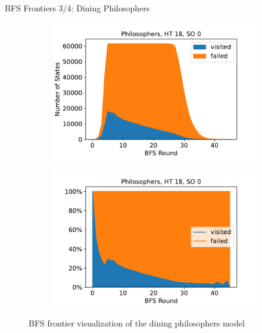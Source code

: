 \documentclass[aspectratio=169]{beamer}
\begin{document}
{\begin{frame}{BFS Frontiers 3/4: Dining Philosophers}
    \begin{figure}
        \begin{subfigure}[b]{.49\textwidth}
            \centering
            \includegraphics[width=\textwidth]{../../evaluation/output-assets/EXP-11-bfs-frontiers-2.pdf}
            \label{fig:evaluation:EXP-11:2}
        \end{subfigure}
        \begin{subfigure}[b]{.49\textwidth}
            \centering
            \includegraphics[width=\textwidth]{../../evaluation/output-assets/EXP-11-bfs-frontiers-6.pdf}
            \label{fig:evaluation:EXP-11:6}
        \end{subfigure}
        \caption{BFS frontier visualization of the dining philosophers model}
        \label{fig:evaluation:EXP-11-2}
    \end{figure}
\end{frame}

}
\end{document}
